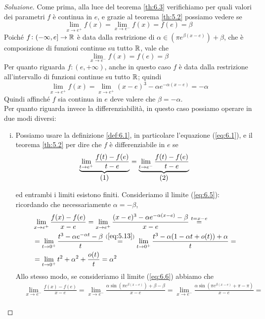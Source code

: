 \begin{proof}[Soluzione]
    Come prima, alla luce del teorema \ref{th:6.3} verifichiamo per quali valori dei parametri $f$ è continua in $e$, e grazie al teorema \ref{th:5.2} possiamo vedere se
    \[
    \lim_{x\to e^+} f(x) = \lim_{x\to e^-} f(x) = f(e) = \beta
    \]
    Poiché $f\colon (-\infty, e]\to \amsbb{R}$ è data dalla restrizione di $\alpha\in(\pi e^{\beta(x-e)})+\beta$, che è composizione di funzioni continue su tutto $\amsbb{R}$, vale che
    \[
    \lim_{x\to e^-}f(x) = f(e) = \beta
    \]
    Per quanto riguarda $f\colon (e, +\infty)$, anche in questo caso $f$ è data dalla restrizione all'intervallo di funzioni continue su tutto $\amsbb{R}$; quindi
    \[
    \lim_{x\to e^+}f(x) = \lim_{x\to e^+} (x-e)^3-\alpha e^{-\alpha (x-e)} = -\alpha
    \]
    Quindi affinché $f$ sia continua in $e$ deve valere che $\beta = -\alpha$.\\
    Per quanto riguarda invece la differenziabilità, in questo caso possiamo operare in due modi diversi:
    \begin{enumerate}[(i)]
        \item Possiamo usare la definizione \ref{def:6.1}, in particolare l'equazione (\ref{eq:6.1}), e il teorema \ref{th:5.2} per dire che $f$ è differenziabile in $e$ se
        \[
        \underbrace{\lim_{t\to e^+}\frac{f(t)-f(e)}{t-e}}_{\stepcounter{equation}\mbox{(\theequation)}} = \underbrace{\lim_{t\to e^-}\frac{f(t)-f(e)}{t-e}}_{\stepcounter{equation}\mbox{(\theequation)}}
        \]
        \addtocounter{equation}{-2}\label{eq:6.5}
        \addtocounter{equation}{0}\label{eq:6.6}
        ed entrambi i limiti esistono finiti. Consideriamo il limite (\ref{eq:6.5}): ricordando che necessariamente $\alpha=-\beta$,
        \[
        \begin{split}
            &\lim_{x\to e^+} \frac{f(x)-f(e)}{x-e} = \lim_{x\to e^+} \frac{(x-e)^3 - \alpha e^{-\alpha(x-e)}-\beta}{x-e} \overset{t=x-e}{=} \\
            & = \lim_{t\to 0^+} \frac{t^3-\alpha e^{-\alpha t}-\beta}{t} \overset{(\ref{eq:5.13})}{=} \lim_{t\to 0^+} \frac{t^3-\alpha(1-\alpha t + o(t))+\alpha}{t} = \\
            & = \lim_{t\to 0^+} t^2 +\alpha^2 + \frac{o(t)}{t} = \alpha^2
        \end{split}
        \]
        Allo stesso modo, se consideriamo il limite (\ref{eq:6.6}) abbiamo che
        \[
        \begin{split}
            & \lim_{x\to e^-} \frac{f(x)-f(e)}{x-e} = \lim_{x\to e^-}\frac{\alpha\sin(\pi e^{\beta(x-e)})+\beta-\beta}{x-e} = \lim_{x\to e^-} \frac{\alpha\sin(\pi e^{\beta(x-e)}+\pi -\pi)}{x-e} = \\

\end{split}\]
\end{enumerate}
\end{proof}
